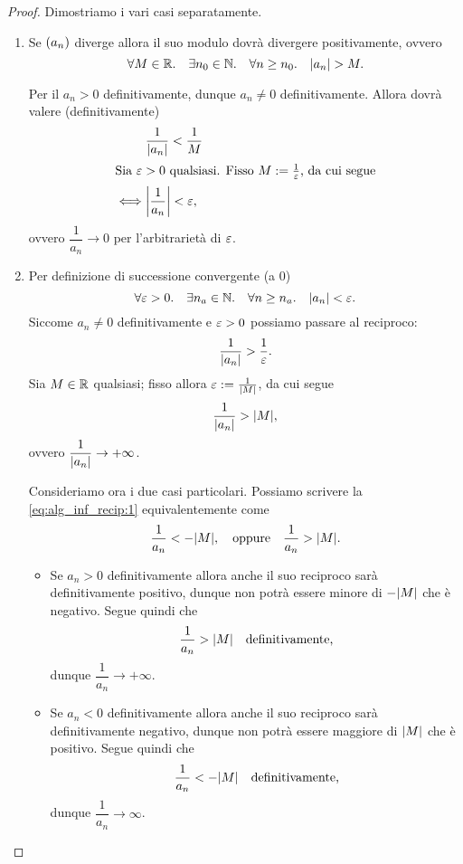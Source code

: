 \begin{proof}
    Dimostriamo i vari casi separatamente.
    \begin{enumerate}[label={(\roman*)}]
        \item Se $\seqn*{a}$ diverge allora il suo modulo dovrà divergere positivamente, ovvero \[
            \forall M \in \R. \quad \exists n_0 \in \N. \quad \forall n \geq n_0. \quad \abs*{a_n} > M.    
        \]

        Per il  $a_n > 0$ definitivamente, dunque $a_n \neq 0$ definitivamente. Allora dovrà valere (definitivamente) \begin{align*}
            &\frac{1}{\abs*{a_n}} < \frac{1}{M} \\
            \intertext{Sia $\eps > 0$ qualsiasi. Fisso $M \deq \frac{1}{\eps}$, da cui segue}
            \iff &\abs*{\frac{1}{a_n}} < \eps,
        \end{align*}
        ovvero $\dfrac{1}{a_n} \to 0$ per l'arbitrarietà di $\eps$.
        \item Per definizione di successione convergente (a $0$)\[
            \forall \eps > 0. \quad \exists n_a \in \N. \quad \forall n \geq n_a. \quad \abs*{a_n} < \eps.    
        \] Siccome $a_n \neq 0$ definitivamente e $\eps > 0$ possiamo passare al reciproco: \[
            \frac{1}{\abs*{a_n}} > \frac{1}{\eps}.
        \] Sia $M \in \R$ qualsiasi; fisso allora $\eps \deq \frac{1}{\abs*{M}}$, da cui segue \begin{equation}
             \frac{1}{\abs*{a_n}} > \abs*{M}, \label{eq:alg_inf_recip:1}
        \end{equation} ovvero $\dfrac{1}{\abs*{a_n}} \to +\infty$.

        Consideriamo ora i due casi particolari. Possiamo scrivere la \eqref{eq:alg_inf_recip:1} equivalentemente come \begin{equation}
            \frac{1}{a_n} < -\abs*{M}, \quad \text{oppure} \quad \frac{1}{a_n} > \abs*{M}.
        \end{equation}
        \begin{itemize}
            \item Se $a_n > 0$ definitivamente allora anche il suo reciproco sarà definitivamente positivo, dunque non potrà essere minore di $-\abs*{M}$ che è negativo. Segue quindi che \[
                \frac{1}{a_n} > \abs*{M} \quad \text{definitivamente,}
            \] dunque $\dfrac{1}{a_n} \to +\infty$.
            \item Se $a_n < 0$ definitivamente allora anche il suo reciproco sarà definitivamente negativo, dunque non potrà essere maggiore di $\abs*{M}$ che è positivo. Segue quindi che \[
                \frac{1}{a_n} < -\abs*{M} \quad \text{definitivamente,}
            \] dunque $\dfrac{1}{a_n} \to \infty$. \qedhere
        \end{itemize}
    \end{enumerate}
\end{proof}

